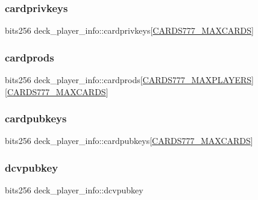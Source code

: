 \subsubsection{\texorpdfstring{cardprivkeys}{cardprivkeys}}
{\footnotesize\ttfamily bits256 deck\+\_\+player\+\_\+info\+::cardprivkeys\mbox{[}\hyperlink{common_8h_a90f0ea2d767ac1915e44acb24a1fe1bd}{C\+A\+R\+D\+S777\+\_\+\+M\+A\+X\+C\+A\+R\+DS}\mbox{]}}

\mbox{\label{structdeck__player__info_afe50d0d657541e924497e3e16765abf9}} 
\subsubsection{\texorpdfstring{cardprods}{cardprods}}
{\footnotesize\ttfamily bits256 deck\+\_\+player\+\_\+info\+::cardprods\mbox{[}\hyperlink{common_8h_a97d6188fd175f4ea7268e9445107a7c0}{C\+A\+R\+D\+S777\+\_\+\+M\+A\+X\+P\+L\+A\+Y\+E\+RS}\mbox{]}\mbox{[}\hyperlink{common_8h_a90f0ea2d767ac1915e44acb24a1fe1bd}{C\+A\+R\+D\+S777\+\_\+\+M\+A\+X\+C\+A\+R\+DS}\mbox{]}}

\mbox{\label{structdeck__player__info_a42b58a3d6acbef59ef0951a2b441c1cd}} 
\subsubsection{\texorpdfstring{cardpubkeys}{cardpubkeys}}
{\footnotesize\ttfamily bits256 deck\+\_\+player\+\_\+info\+::cardpubkeys\mbox{[}\hyperlink{common_8h_a90f0ea2d767ac1915e44acb24a1fe1bd}{C\+A\+R\+D\+S777\+\_\+\+M\+A\+X\+C\+A\+R\+DS}\mbox{]}}

\mbox{\label{structdeck__player__info_addcc08f5394486871a4fbec618c84df9}} 
\subsubsection{\texorpdfstring{dcvpubkey}{dcvpubkey}}
{\footnotesize\ttfamily bits256 deck\+\_\+player\+\_\+info\+::dcvpubkey}

